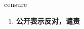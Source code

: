 
\begin{frame}
{\huge censure}
\begin{center}
\begin{enumerate}\Large
  \item \textbf{公开表示反对，谴责}
\end{enumerate}
\end{center}
\end{frame}
